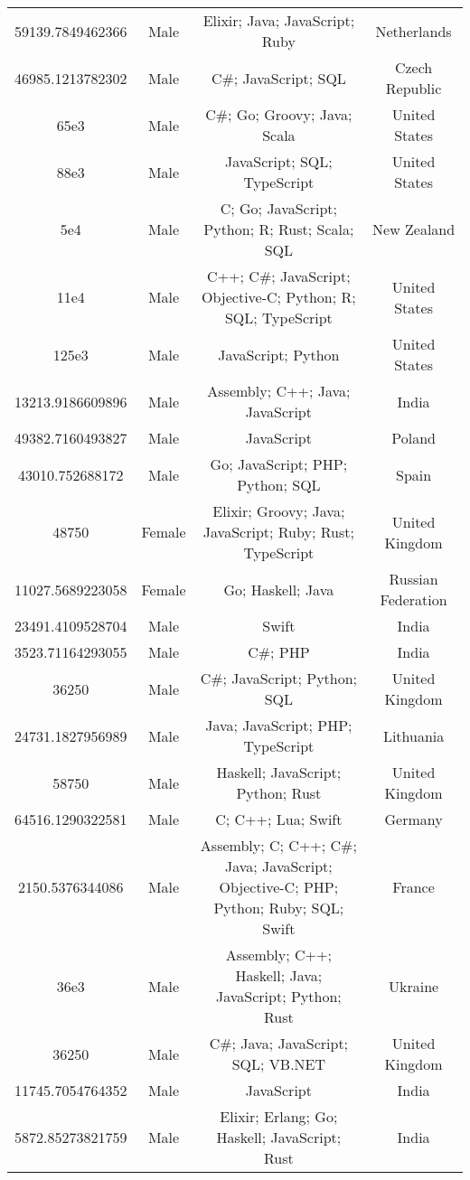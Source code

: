 \begin{center}
\begin{tabular}{ |c|c|c|c| }
59139.7849462366  &  Male  &  Elixir; Java; JavaScript; Ruby  &  Netherlands  \\ 
46985.1213782302  &  Male  &  C\#; JavaScript; SQL  &  Czech Republic  \\ 
65e3  &  Male  &  C\#; Go; Groovy; Java; Scala  &  United States  \\ 
88e3  &  Male  &  JavaScript; SQL; TypeScript  &  United States  \\ 
5e4  &  Male  &  C; Go; JavaScript; Python; R; Rust; Scala; SQL  &  New Zealand  \\ 
11e4  &  Male  &  C++; C\#; JavaScript; Objective-C; Python; R; SQL; TypeScript  &  United States  \\ 
125e3  &  Male  &  JavaScript; Python  &  United States  \\ 
13213.9186609896  &  Male  &  Assembly; C++; Java; JavaScript  &  India  \\ 
49382.7160493827  &  Male  &  JavaScript  &  Poland  \\ 
43010.752688172  &  Male  &  Go; JavaScript; PHP; Python; SQL  &  Spain  \\ 
48750  &  Female  &  Elixir; Groovy; Java; JavaScript; Ruby; Rust; TypeScript  &  United Kingdom  \\ 
11027.5689223058  &  Female  &  Go; Haskell; Java  &  Russian Federation  \\ 
23491.4109528704  &  Male  &  Swift  &  India  \\ 
3523.71164293055  &  Male  &  C\#; PHP  &  India  \\ 
36250  &  Male  &  C\#; JavaScript; Python; SQL  &  United Kingdom  \\ 
24731.1827956989  &  Male  &  Java; JavaScript; PHP; TypeScript  &  Lithuania  \\ 
58750  &  Male  &  Haskell; JavaScript; Python; Rust  &  United Kingdom  \\ 
64516.1290322581  &  Male  &  C; C++; Lua; Swift  &  Germany  \\ 
2150.5376344086  &  Male  &  Assembly; C; C++; C\#; Java; JavaScript; Objective-C; PHP; Python; Ruby; SQL; Swift  &  France  \\ 
36e3  &  Male  &  Assembly; C++; Haskell; Java; JavaScript; Python; Rust  &  Ukraine  \\ 
36250  &  Male  &  C\#; Java; JavaScript; SQL; VB.NET  &  United Kingdom  \\ 
11745.7054764352  &  Male  &  JavaScript  &  India  \\ 
5872.85273821759  &  Male  &  Elixir; Erlang; Go; Haskell; JavaScript; Rust  &  India  \\ 

\end{tabular}
\end{center}
